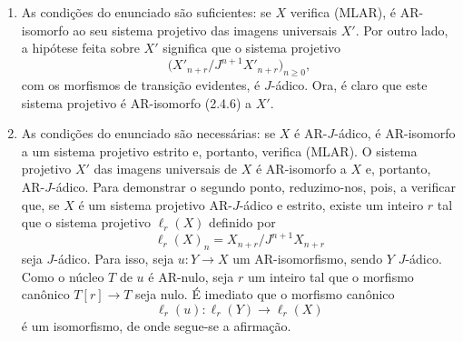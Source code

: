 \begin{prooftext}[Demonstração]
\begin{enumerate}[label=(\alph*)]
\item As condições do enunciado são suficientes: se $X$ verifica (MLAR), é AR-isomorfo ao seu sistema projetivo das imagens universais $X'$. Por outro lado, a hipótese feita sobre $X'$ significa que o sistema projetivo
\[
\bigl(X'_{n+r}/J^{n+1}X'_{n+r}\bigr)_{n\ge0},
\]
com os morfismos de transição evidentes, é $J$-ádico. Ora, é claro que este sistema projetivo é AR-isomorfo (2.4.6) a $X'$.
\item As condições do enunciado são necessárias: se $X$ é AR-$J$-ádico, é AR-isomorfo a um sistema projetivo estrito e, portanto, verifica (MLAR). O sistema projetivo $X'$ das imagens universais de $X$ é AR-isomorfo a $X$ e, portanto, AR-$J$-ádico. Para demonstrar o segundo ponto, reduzimo-nos, pois, a verificar que, se $X$ é um sistema projetivo AR-$J$-ádico e estrito, existe um inteiro $r$ tal que o sistema projetivo $\ell_r(X)$ definido por
\[
\ell_r(X)_n=X_{n+r}/J^{n+1}X_{n+r}
\]
seja $J$-ádico. Para isso, seja $u:Y\to X$ um AR-isomorfismo, sendo $Y$ $J$-ádico. Como o núcleo $T$ de $u$ é AR-nulo, seja $r$ um inteiro tal que o morfismo canônico $T[r]\to T$ seja nulo. É imediato que o morfismo canônico
\[
\ell_r(u):\ell_r(Y)\longrightarrow\ell_r(X)
\]
é um isomorfismo, de onde segue-se a afirmação.
\end{enumerate}
\end{prooftext}
